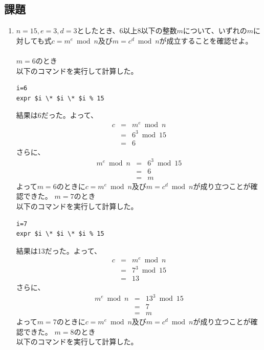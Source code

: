 \documentclass[a4j]{celb-report}
\begin{document}
\subsection{課題}
\begin{enumerate}
	\renewcommand{\labelenumi}{\arabic{enumi}}
	\item $ n = 15 , e = 3 , d = 3 $としたとき、6以上8以下の整数$m$について、いずれの$m$に対しても式$ c = m ^e \bmod n $及び$ m = c ^d \bmod n $が成立することを確認せよ。\\\\
$ m = 6 $のとき\\
以下のコマンドを実行して計算した。
\begin{lstlisting}[basicstyle=\ttfamily\footnotesize, frame=single]
i=6
expr $i \* $i \* $i % 15
\end{lstlisting}
結果は6だった。よって、
\begin{eqnarray}
	c & = & m ^e \bmod n \nonumber \\
	& = & 6 ^3 \bmod 15 \nonumber \\
	& = & 6 \nonumber
\end{eqnarray}
さらに、
\begin{eqnarray}
	m ^e \bmod n & = & 6 ^3 \bmod 15 \nonumber \\
	& = & 6 \nonumber \\
	& = & m \nonumber
\end{eqnarray}
よって$ m = 6 $のときに$ c = m ^e \bmod n $及び$ m = c ^d \bmod n $が成り立つことが確認できた。
$ m = 7 $のとき\\
以下のコマンドを実行して計算した。
\begin{lstlisting}[basicstyle=\ttfamily\footnotesize, frame=single]
i=7
expr $i \* $i \* $i % 15
\end{lstlisting}
結果は13だった。よって、
\begin{eqnarray}
	c & = & m ^e \bmod n \nonumber \\
	& = & 7 ^3 \bmod 15 \nonumber \\
	& = & 13 \nonumber
\end{eqnarray}
さらに、
\begin{eqnarray}
	m ^e \bmod n & = & 13 ^3 \bmod 15 \nonumber \\
	& = & 7 \nonumber \\
	& = & m \nonumber
\end{eqnarray}
よって$ m = 7 $のときに$ c = m ^e \bmod n $及び$ m = c ^d \bmod n $が成り立つことが確認できた。
$ m = 8 $のとき\\
以下のコマンドを実行して計算した。

\end{enumerate}
\end{document}
